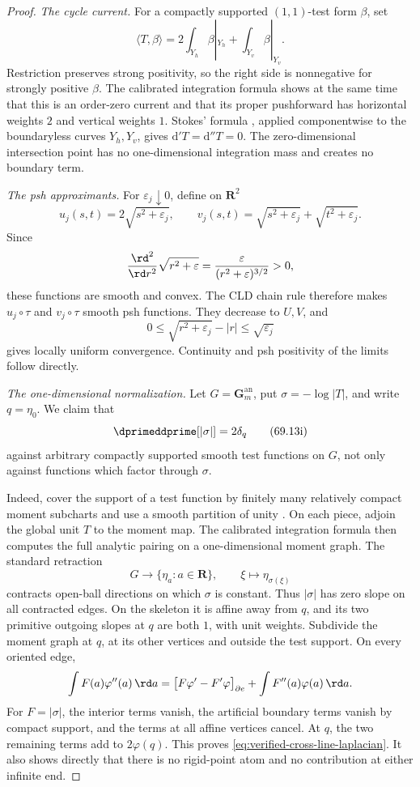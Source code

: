 \begin{proof}
\emph{The cycle current.}
For a compactly supported \((1,1)\)-test form \(\beta\), set
\[
 \langle T,\beta\rangle
   =2\int_{Y_h}\beta|_{Y_h}+\int_{Y_v}\beta|_{Y_v}.
\tag{69.13h}\label{eq:verified-cross-current-pairing}
\]
Restriction preserves strong positivity, so the right side is nonnegative
for strongly positive \(\beta\).  The calibrated integration formula
\cite[Proposition~5.10.1(d)]{CLD25} shows at the same time that this is an
order-zero current and that its proper pushforward has horizontal weights
\(2\) and vertical weights \(1\).  Stokes' formula
\cite[Proposition~5.11.1]{CLD25}, applied componentwise to the
boundaryless curves \(Y_h,Y_v\), gives
\(\mathrm d'T=\mathrm d''T=0\).  The zero-dimensional intersection point
has no one-dimensional integration mass and creates no boundary term.

\emph{The psh approximants.}
For \(\varepsilon_j\downarrow0\), define on \(\mathbf R^2\)
\[
 u_j(s,t)=2\sqrt{s^2+\varepsilon_j},
 \qquad
 v_j(s,t)=\sqrt{s^2+\varepsilon_j}
          +\sqrt{t^2+\varepsilon_j}.
\]
Since
\[
 \frac{\rd^2}{\rd r^2}\sqrt{r^2+\varepsilon}
       =\frac{\varepsilon}{(r^2+\varepsilon)^{3/2}}>0,
\]
these functions are smooth and convex.  The CLD chain rule therefore makes
\(u_j\circ\tau\) and \(v_j\circ\tau\) smooth psh functions.  They decrease
to \(U,V\), and
\[
          0\leq\sqrt{r^2+\varepsilon_j}-|r|
             \leq\sqrt{\varepsilon_j}
\]
gives locally uniform convergence.  Continuity and psh positivity of the
limits follow directly.

\emph{The one-dimensional normalization.}
Let \(G=\mathbf G_m^{\mathrm{an}}\), put
\(\sigma=-\log|T|\), and write \(q=\eta_0\).  We claim that
\[
                         \dprimeddprime[|\sigma|]=2\delta_q
\tag{69.13i}\label{eq:verified-cross-line-laplacian}
\]
against arbitrary compactly supported smooth test functions on \(G\), not
only against functions which factor through \(\sigma\).

Indeed, cover the support of a test function by finitely many relatively
compact moment subcharts and use a smooth partition of unity
\cite[Proposition~15.2.8]{CLD25}.  On each piece, adjoin the global unit
\(T\) to the moment map.  The calibrated integration formula then computes
the full analytic pairing on a one-dimensional moment graph.  The standard
retraction
\[
             G\longrightarrow\{\eta_a:a\in\mathbf R\},
             \qquad \xi\longmapsto\eta_{\sigma(\xi)}
\]
contracts open-ball directions on which \(\sigma\) is constant.  Thus
\(|\sigma|\) has zero slope on all contracted edges.  On the skeleton it is
affine away from \(q\), and its two primitive outgoing slopes at \(q\) are
both \(1\), with unit weights.  Subdivide the moment graph at \(q\), at its
other vertices and outside the test support.  On every oriented edge,
\[
 \int F(a)\varphi''(a)\,\rd a
 =\bigl[F\varphi'-F'\varphi\bigr]_{\partial e}
  +\int F''(a)\varphi(a)\,\rd a.
\]
For \(F=|\sigma|\), the interior terms vanish, the artificial boundary
terms vanish by compact support, and the terms at all affine vertices
cancel.  At \(q\), the two remaining terms add to \(2\varphi(q)\).
This proves \eqref{eq:verified-cross-line-laplacian}.  It also shows directly
that there is no rigid-point atom and no contribution at either infinite
end.


\end{proof}
